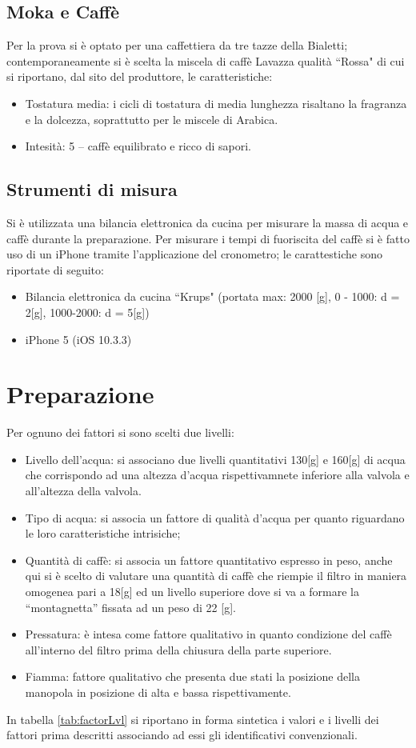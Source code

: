 \subsection{Moka e Caffè}
Per la prova si è optato per una caffettiera da tre tazze della Bialetti; contemporaneamente si è scelta la miscela di caffè Lavazza qualità “Rossa" di cui si riportano, dal sito del produttore, le caratteristiche:
\begin{itemize}
  \item Tostatura media: i cicli di tostatura di media lunghezza risaltano la fragranza e la dolcezza, soprattutto per le miscele di Arabica.
  \item Intesità: 5 -- caffè equilibrato e ricco di sapori.
\end{itemize}
\subsection{Strumenti di misura}
Si è utilizzata una bilancia elettronica da cucina per misurare la massa di acqua e caffè durante la preparazione.
Per misurare i tempi di fuoriscita del caffè si è fatto uso di un iPhone tramite l'applicazione del cronometro; le carattestiche sono riportate di seguito:
\begin{itemize}
  \item Bilancia elettronica da cucina “Krups" (portata max: 2000 [g], 0 - 1000: d = 2[g], 1000-2000: d = 5[g])
  \item iPhone 5 (iOS 10.3.3)
\end{itemize}


\section{Preparazione}
Per ognuno dei fattori si sono scelti due livelli:
\begin{itemize}
  \item Livello dell'acqua: si associano due livelli quantitativi 130[g] e 160[g] di acqua che corrispondo ad una altezza d'acqua rispettivamnete inferiore alla valvola e all'altezza della valvola.
  \item Tipo di acqua: si associa un fattore di qualità d'acqua per quanto riguardano le loro caratteristiche intrisiche;
  \item Quantità di caffè: si associa un fattore quantitativo espresso in peso, anche qui si è scelto di valutare una quantità di caffè che riempie il filtro in maniera omogenea pari a 18[g] ed un livello superiore dove si va a formare la “montagnetta” fissata ad un peso di 22 [g].
  \item Pressatura: è intesa come fattore qualitativo in quanto condizione del caffè all'interno del filtro prima della chiusura della parte superiore.
  \item Fiamma: fattore qualitativo che presenta due stati la posizione della manopola in posizione di alta e bassa rispettivamente.
\end{itemize}
In tabella \ref{tab:factorLvl} si riportano in forma sintetica i valori e i livelli dei fattori prima descritti associando ad essi gli identificativi convenzionali.

